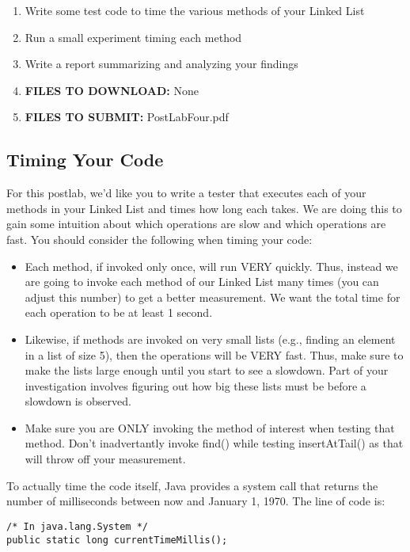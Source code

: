 \documentclass[paper=a4, fontsize=11pt, parskip=full]{scrartcl} %
\numberwithin{equation}{section} %
\numberwithin{figure}{section} %
\numberwithin{table}{section} %
\begin{document}
\begin{enumerate}
	\item Write some test code to time the various methods of your Linked List
	\item Run a small experiment timing each method
	\item Write a report summarizing and analyzing your findings
	\item \textbf{FILES TO DOWNLOAD:} None
	\item \textbf{FILES TO SUBMIT:} PostLabFour.pdf
\end{enumerate}

\subsection{Timing Your Code}

For this postlab, we'd like you to write a tester that executes each of your methods in your Linked List and times how long each takes. We are doing this to gain some intuition about which operations are slow and which operations are fast. You should consider the following when timing your code:

\begin{itemize}
	\item Each method, if invoked only once, will run VERY quickly. Thus, instead we are going to invoke each method of our Linked List many times (you can adjust this number) to get a better measurement. We want the total time for each operation to be at least 1 second.
	\item Likewise, if methods are invoked on very small lists (e.g., finding an element in a list of size 5), then the operations will be VERY fast. Thus, make sure to make the lists large enough until you start to see a slowdown. Part of your investigation involves figuring out how big these lists must be before a slowdown is observed.
	\item Make sure you are ONLY invoking the method of interest when testing that method. Don't inadvertantly invoke find() while testing insertAtTail() as that will throw off your measurement.
\end{itemize}

To actually time the code itself, Java provides a system call that returns the number of milliseconds between now and January 1, 1970. The line of code is:

\begin{lstlisting}
/* In java.lang.System */
public static long currentTimeMillis();
\end{lstlisting}
\end{document}
